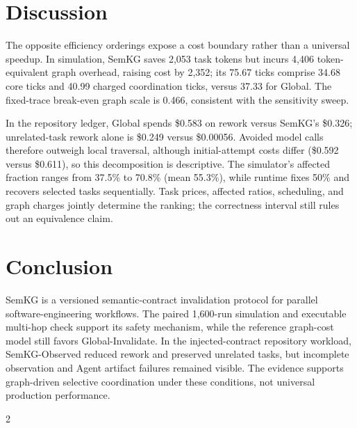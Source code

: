 \documentclass[a4paper,runningheads]{llncs}
\begin{document}
\section{Discussion}
The opposite efficiency orderings expose a cost boundary rather than a universal speedup. In simulation, SemKG saves 2,053 task tokens but incurs 4,406 token-equivalent graph overhead, raising cost by 2,352; its 75.67 ticks comprise 34.68 core ticks and 40.99 charged coordination ticks, versus 37.33 for Global. The fixed-trace break-even graph scale is 0.466, consistent with the sensitivity sweep.

In the repository ledger, Global spends \$0.583 on rework versus SemKG's \$0.326; unrelated-task rework alone is \$0.249 versus \$0.00056. Avoided model calls therefore outweigh local traversal, although initial-attempt costs differ (\$0.592 versus \$0.611), so this decomposition is descriptive. The simulator's affected fraction ranges from 37.5\% to 70.8\% (mean 55.3\%), while runtime fixes 50\% and recovers selected tasks sequentially. Task prices, affected ratios, scheduling, and graph charges jointly determine the ranking; the correctness interval still rules out an equivalence claim.

\section{Conclusion}
SemKG is a versioned semantic-contract invalidation protocol for parallel software-engineering workflows. The paired 1,600-run simulation and executable multi-hop check support its safety mechanism, while the reference graph-cost model still favors Global-Invalidate. In the injected-contract repository workload, SemKG-Observed reduced rework and preserved unrelated tasks, but incomplete observation and Agent artifact failures remained visible. The evidence supports graph-driven selective coordination under these conditions, not universal production performance.

\footnotesize
\vspace{-8pt}
\begin{multicols}{2}
\let\small\footnotesize


\end{multicols}
\end{document}
